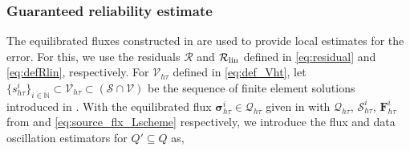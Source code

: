 \documentclass[review,11pt]{article}
\numberwithin{equation}{section}
\def \t  {\tau}
\def \N  {{\mathbb{N}}}
\def \htt {{h\tau}}
\def \calV {\mathcal{V}}
\def \calQ {\bm{\mathcal{Q}}}
\def \calR {\mathcal{R}}
\def \calS {\mathcal{S}}
\def \flx {\bm{\sigma}_{\htt}^i}
\def \Shti {\calS_\htt^i}
\def \Fhti {\bm{F}_\htt^i}
\begin{document}
\subsubsection{Guaranteed reliability estimate}
The equilibrated fluxes constructed in  are used to provide local estimates for the error. For this, we use the residuals $\calR$  and $\calR_{\rm lin}$ defined in \eqref{eq:residual} and \eqref{eq:defRlin}, respectively. For $\calV_\htt$ defined in \eqref{eq:def_Vht}, let $\{s_{h\t}^{i}\}_{i\in \N}\subset \mathcal V_{h\tau}\subset (\calS\cap \calV)$ be the sequence of finite element solutions introduced in . With the equilibrated flux $\flx\in \calQ_\htt$ given in  with $\calQ_\htt$, $\Shti$, $\Fhti$ from  and \eqref{eq:source_flx_Lscheme} respectively, we introduce the flux and data oscillation estimators for $Q'\subseteq Q$ as,
\end{document}
